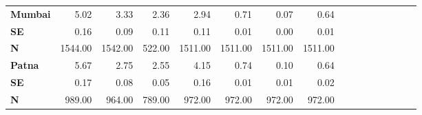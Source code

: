 \begin{tabular}{@{\extracolsep{5pt}}lrrrrrrrrrrrrrrr}
{\bf Mumbai} & 5.02\phantom{***} & 3.33\phantom{***} & 2.36\phantom{***} & 2.94\phantom{***} & 0.71\phantom{***} & 0.07\phantom{***} & 0.64\phantom{***} \\
{\bf SE} & 0.16\phantom{***} & 0.09\phantom{***} & 0.11\phantom{***} & 0.11\phantom{***} & 0.01\phantom{***} & 0.00\phantom{***} & 0.01\phantom{***} \\
{\bf N} & 1544.00\phantom{***} & 1542.00\phantom{***} & 522.00\phantom{***} & 1511.00\phantom{***} & 1511.00\phantom{***} & 1511.00\phantom{***} & 1511.00\phantom{***} \\
{\bf Patna} & 5.67\phantom{***} & 2.75\phantom{***} & 2.55\phantom{***} & 4.15\phantom{***} & 0.74\phantom{***} & 0.10\phantom{***} & 0.64\phantom{***} \\
{\bf SE} & 0.17\phantom{***} & 0.08\phantom{***} & 0.05\phantom{***} & 0.16\phantom{***} & 0.01\phantom{***} & 0.01\phantom{***} & 0.02\phantom{***} \\
{\bf N} & 989.00\phantom{***} & 964.00\phantom{***} & 789.00\phantom{***} & 972.00\phantom{***} & 972.00\phantom{***} & 972.00\phantom{***} & 972.00\phantom{***} \\
\hline
\end{tabular}
